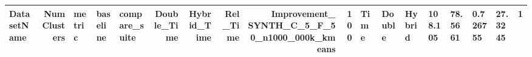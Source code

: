 \begin{tabular}{lrlllrrrrr}
\toprule
DatasetName & NumClusters & metric & baseline & compare_suite & Double_Time & Hybrid_Time & Rel_Time & Improvement_%
\midrule
SYNTH_C_5_F_50_n1000_000k_kmeans & 100 & Time & Double & Hybrid & 108.105 & 78.5661 & 0.726755 & 27.3245 & 1 \\
\bottomrule
\end{tabular}
